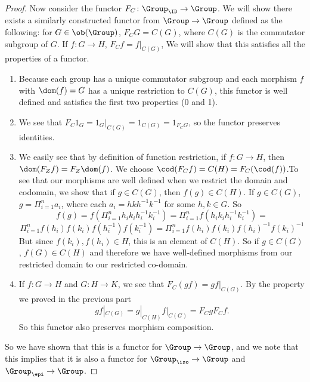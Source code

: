 \documentclass[main.tex]{subfiles}
\begin{document}
\begin{proof}
Now consider the functor $F_C\colon  \Group_{\ID} \rightarrow \Group$. We will show there exists a similarly constructed functor from $\Group \rightarrow \Group$ defined as the following: for $G \in \ob(\Group)$, $F_CG = C(G)$, where $ C(G) $ is the commutator subgroup of $G$. If $f \colon G \rightarrow H$, $F_Cf = f|_{C(G)}$, We will show that this satisfies all the properties of a functor.
\begin{enumerate}
    \item Because each group has a unique commutator subgroup and each morphism $f$ with $\dom(f) = G$ has a unique restriction to $C(G)$, this functor is well defined and satisfies the first two properties (0 and 1).
    \item We see that $F_{C} 1_{G} = 1_{G}|_{C(G)} = 1_{C(G)} = 1_{F_{C}G}$, so the functor preserves identities. 
    \item We easily see that by definition of function restriction, if $f\colon G \rightarrow H$, then $\dom(F_{Z}f) = F_{Z}\dom(f)$. We choose $\cod(F_{C}f) = C(H) = F_C(\cod(f))$.To see that our morphisms are well defined when we restrict the domain and codomain, we show that if $g \in C(G)$, then $f(g) \in C(H)$. If $g \in C(G)$, $g = \Pi_{i = 1}^{n} a_i$, where each $a_i = hkh^{-1}k^{-1}$ for some $h,k \in G$. So $$f(g) = f(\Pi_{i = 1}^{n} h_ik_ih_i^{-1}k_i^{-1}) = \Pi_{i = 1}^{n} f(h_ik_ih_i^{-1}k_i^{-1}) =$$ $$  \Pi_{i = 1}^{n} f(h_i)f(k_i)f(h_i^{-1})f(k_i^{-1}) = \Pi_{i = 1}^{n} f(h_i)f(k_i)f(h_i)^{-1}f(k_i)^{-1}$$ But since $f(k_i), f(h_i) \in H$, this is an element of $C(H)$. So if $g \in C(G)$, $f(G) \in C(H)$ and therefore we have well-defined morphisms from our restricted domain to our restricted co-domain. 
    \item If $f\colon G \rightarrow H$ and $G\colon H \rightarrow K$, we see that $F_C(gf) = gf|_{C(G)}$. By the property we proved in the previous part \[gf|_{C(G)} = g|_{C(H)}f|_{C(G)} = F_CgF_Cf.\] So this functor also preserves morphism composition.
\end{enumerate}

So we have shown that this is a functor for $\Group \rightarrow \Group$, and we note that this implies that it is also a functor for $\Group_{\iso} \rightarrow \Group$ and $\Group _{\epi} \rightarrow \Group$. 


\end{proof}
\end{document}
